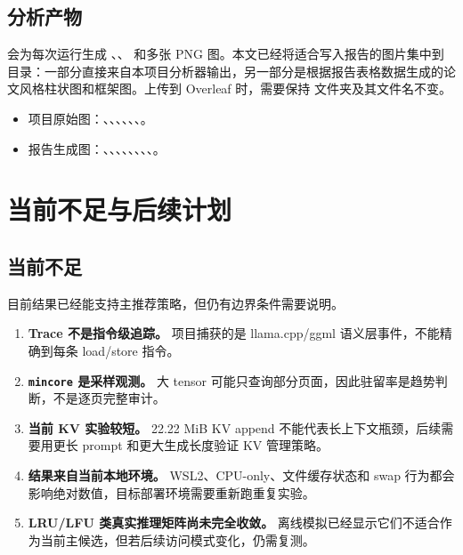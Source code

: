 \documentclass[a4paper]{article}
\begin{document}
\subsection{分析产物}

 会为每次运行生成 、、 和多张 PNG 图。本文已经将适合写入报告的图片集中到  目录：一部分直接来自本项目分析器输出，另一部分是根据报告表格数据生成的论文风格柱状图和框架图。上传到 Overleaf 时，需要保持  文件夹及其文件名不变。

\begin{itemize}
    \item 项目原始图：、、、、、、。
    \item 报告生成图：、、、、、、、、。
\end{itemize}

\section{当前不足与后续计划}

\subsection{当前不足}

目前结果已经能支持主推荐策略，但仍有边界条件需要说明。

\begin{enumerate}
    \item \textbf{Trace 不是指令级追踪。} 项目捕获的是 llama.cpp/ggml 语义层事件，不能精确到每条 load/store 指令。
    \item \textbf{\texttt{mincore} 是采样观测。} 大 tensor 可能只查询部分页面，因此驻留率是趋势判断，不是逐页完整审计。
    \item \textbf{当前 KV 实验较短。} 22.22 MiB KV append 不能代表长上下文瓶颈，后续需要用更长 prompt 和更大生成长度验证 KV 管理策略。
    \item \textbf{结果来自当前本地环境。} WSL2、CPU-only、文件缓存状态和 swap 行为都会影响绝对数值，目标部署环境需要重新跑重复实验。
    \item \textbf{LRU/LFU 类真实推理矩阵尚未完全收敛。} 离线模拟已经显示它们不适合作为当前主候选，但若后续访问模式变化，仍需复测。
\end{enumerate}
\end{document}
